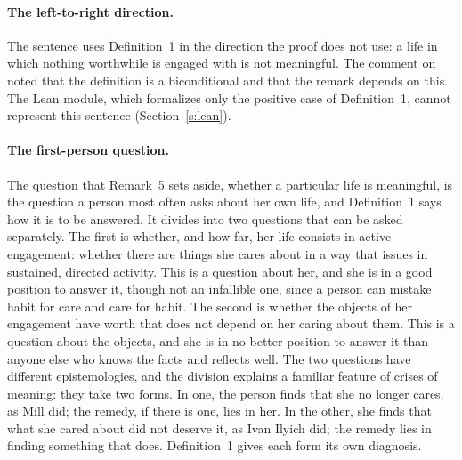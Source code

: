 \paragraph{The left-to-right direction.} The sentence uses Definition~1 in the direction the proof does not use: a life in which nothing worthwhile is engaged with is not meaningful. The comment on  noted that the definition is a biconditional and that the remark depends on this. The Lean module, which formalizes only the positive case of Definition~1, cannot represent this sentence (Section~\ref{s:lean}).

\paragraph{The first-person question.} The question that Remark~5 sets aside, whether a particular life is meaningful, is the question a person most often asks about her own life, and Definition~1 says how it is to be answered. It divides into two questions that can be asked separately. The first is whether, and how far, her life consists in active engagement: whether there are things she cares about in a way that issues in sustained, directed activity. This is a question about her, and she is in a good position to answer it, though not an infallible one, since a person can mistake habit for care and care for habit. The second is whether the objects of her engagement have worth that does not depend on her caring about them. This is a question about the objects, and she is in no better position to answer it than anyone else who knows the facts and reflects well. The two questions have different epistemologies, and the division explains a familiar feature of crises of meaning: they take two forms. In one, the person finds that she no longer cares, as Mill did; the remedy, if there is one, lies in her. In the other, she finds that what she cared about did not deserve it, as Ivan Ilyich did; the remedy lies in finding something that does. Definition~1 gives each form its own diagnosis.

